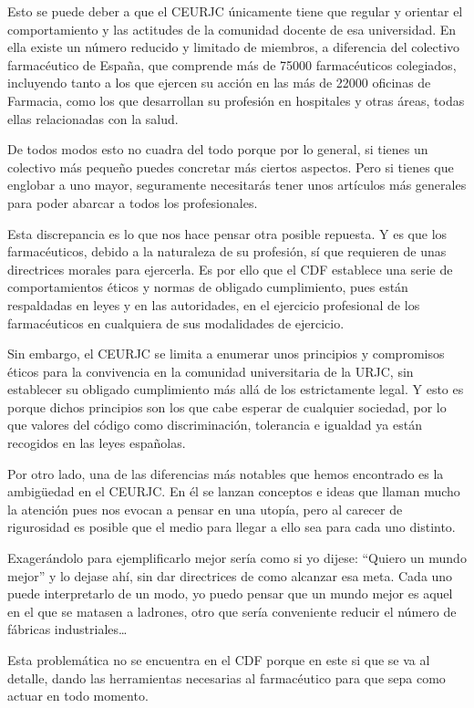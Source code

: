\documentclass[11pt,a4paper]{article}
\begin{document}
Esto se puede deber a que el CEURJC únicamente tiene que regular y orientar el comportamiento y las actitudes de la comunidad docente de esa universidad. En ella existe un número reducido y limitado de miembros, a diferencia del colectivo farmacéutico de España, que comprende más de 75000 farmacéuticos colegiados, incluyendo tanto a los que ejercen su acción en las más de 22000 oficinas de Farmacia, como los que desarrollan su profesión en hospitales y otras áreas, todas ellas relacionadas con la salud. 

De todos modos esto no cuadra del todo porque por lo general, si tienes un colectivo más pequeño puedes concretar más ciertos aspectos. Pero si tienes que englobar a uno mayor, seguramente necesitarás tener unos artículos más generales para poder abarcar a todos los profesionales.

Esta discrepancia es lo que nos hace pensar otra posible repuesta. Y es que los farmacéuticos, debido a la naturaleza de su profesión, sí que requieren de unas directrices morales para ejercerla. Es por ello que el CDF establece una serie de comportamientos éticos y normas de obligado cumplimiento, pues están respaldadas en leyes y en las autoridades, en el ejercicio profesional de los farmacéuticos en cualquiera de sus modalidades de ejercicio.

Sin embargo, el CEURJC se limita a enumerar unos principios y compromisos éticos para la convivencia en la comunidad universitaria de la URJC, sin establecer su obligado cumplimiento más allá de los estrictamente legal. Y esto es porque dichos principios son los que cabe esperar de cualquier sociedad, por lo que valores del código como discriminación, tolerancia e igualdad ya están recogidos en las leyes españolas.

Por otro lado, una de las diferencias más notables que hemos encontrado es la ambigüedad en el CEURJC. En él se lanzan conceptos e ideas que llaman mucho la atención pues nos evocan a pensar en una utopía, pero al carecer de rigurosidad es posible que el medio para llegar a ello sea para cada uno distinto.

Exagerándolo para ejemplificarlo mejor sería como si yo dijese: “Quiero un mundo mejor” y lo dejase ahí, sin dar directrices de como alcanzar esa meta. Cada uno puede interpretarlo de un modo, yo puedo pensar que un mundo mejor es aquel en el que se matasen a ladrones, otro que sería conveniente reducir el número de fábricas industriales…

Esta problemática no se encuentra en el CDF porque en este si que se va al detalle, dando las herramientas necesarias al farmacéutico para que sepa como actuar en todo momento.
\end{document}
